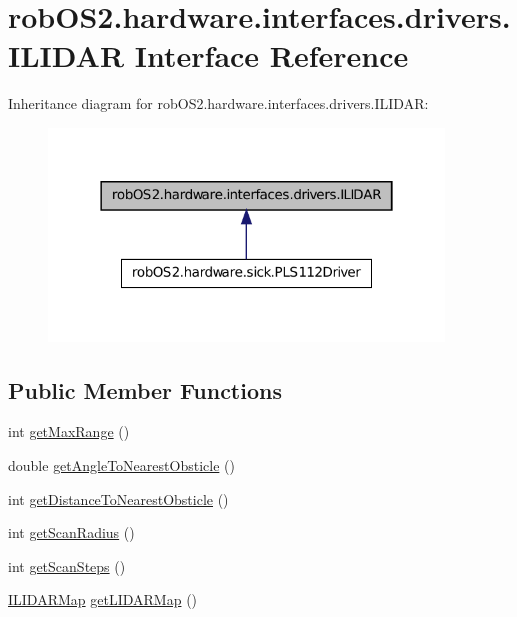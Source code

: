 \hypertarget{interfacerob_o_s2_1_1hardware_1_1interfaces_1_1drivers_1_1_i_l_i_d_a_r}{
\section{robOS2.hardware.interfaces.drivers.ILIDAR Interface Reference}
\label{interfacerob_o_s2_1_1hardware_1_1interfaces_1_1drivers_1_1_i_l_i_d_a_r}
}


Inheritance diagram for robOS2.hardware.interfaces.drivers.ILIDAR:\nopagebreak
\begin{figure}[H]
\begin{center}
\leavevmode
\includegraphics[width=298pt]{interfacerob_o_s2_1_1hardware_1_1interfaces_1_1drivers_1_1_i_l_i_d_a_r__inherit__graph}
\end{center}
\end{figure}
\subsection*{Public Member Functions}
\begin{DoxyCompactItemize}
\item 
int \hyperlink{interfacerob_o_s2_1_1hardware_1_1interfaces_1_1drivers_1_1_i_l_i_d_a_r_a1db41dea5434217065d807cea3fc4f4a}{getMaxRange} ()
\item 
double \hyperlink{interfacerob_o_s2_1_1hardware_1_1interfaces_1_1drivers_1_1_i_l_i_d_a_r_a82dc3c4240240a960632efb4d9020dd5}{getAngleToNearestObsticle} ()
\item 
int \hyperlink{interfacerob_o_s2_1_1hardware_1_1interfaces_1_1drivers_1_1_i_l_i_d_a_r_a05eb2f2405065ac384dd27b9321a0636}{getDistanceToNearestObsticle} ()
\item 
int \hyperlink{interfacerob_o_s2_1_1hardware_1_1interfaces_1_1drivers_1_1_i_l_i_d_a_r_ab37045fad0152f11401b08d4d8b4c9a8}{getScanRadius} ()
\item 
int \hyperlink{interfacerob_o_s2_1_1hardware_1_1interfaces_1_1drivers_1_1_i_l_i_d_a_r_aac89f3cd52c76cf3fde736262f833d23}{getScanSteps} ()
\item 
\hyperlink{interfacerob_o_s2_1_1mapping_1_1lidar_1_1_i_l_i_d_a_r_map}{ILIDARMap} \hyperlink{interfacerob_o_s2_1_1hardware_1_1interfaces_1_1drivers_1_1_i_l_i_d_a_r_a04abdad26d8b532a254ecbba618178b9}{getLIDARMap} ()
\end{DoxyCompactItemize}


